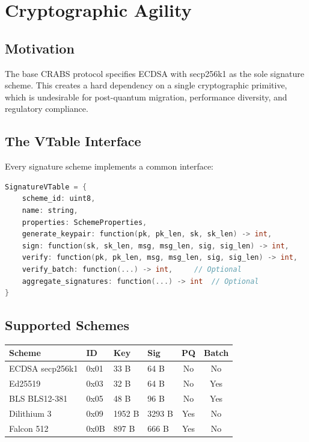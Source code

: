 \documentclass[sigconf,nonacm]{acmart}
\newcommand{\crab}{\textsc{CRABS}}
\begin{document}
\section{Cryptographic Agility}

\subsection{Motivation}

The base \crab{} protocol specifies ECDSA with secp256k1 as the sole signature scheme. This creates a hard dependency on a single cryptographic primitive, which is undesirable for post-quantum migration, performance diversity, and regulatory compliance.

\subsection{The VTable Interface}

Every signature scheme implements a common interface:

\begin{lstlisting}[language=C]
SignatureVTable = {
    scheme_id: uint8,
    name: string,
    properties: SchemeProperties,
    generate_keypair: function(pk, pk_len, sk, sk_len) -> int,
    sign: function(sk, sk_len, msg, msg_len, sig, sig_len) -> int,
    verify: function(pk, pk_len, msg, msg_len, sig, sig_len) -> int,
    verify_batch: function(...) -> int,     // Optional
    aggregate_signatures: function(...) -> int  // Optional
}
\end{lstlisting}

\subsection{Supported Schemes}

\vspace{4pt}
\begin{tabularx}{\columnwidth}{llllcc}
\toprule
\textbf{Scheme} & \textbf{ID} & \textbf{Key} & \textbf{Sig} & \textbf{PQ} & \textbf{Batch} \\
\midrule
ECDSA secp256k1 & 0x01 & 33 B & 64 B & No & No \\
Ed25519 & 0x03 & 32 B & 64 B & No & Yes \\
BLS BLS12-381 & 0x05 & 48 B & 96 B & No & Yes \\
Dilithium 3 & 0x09 & 1952 B & 3293 B & Yes & No \\
Falcon 512 & 0x0B & 897 B & 666 B & Yes & No \\
\bottomrule
\end{tabularx}
\end{document}
